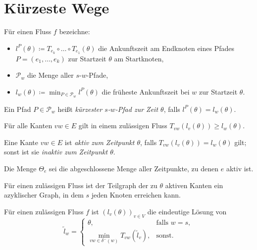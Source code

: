 \section{Kürzeste Wege}

\begin{frame}
	\begin{definition}
		Für einen Fluss $f$ bezeichne:
		\begin{itemize}[label=\color{darkblue}$\bullet$]
			\item\pause $l^P(\theta)\coloneq T_{e_k}\circ\dots\circ T_{e_1}(\theta)$ die Ankunftszeit am Endknoten eines Pfades $P=(e_1,\dots,e_k)$ zur Startzeit $\theta$ am Startknoten,
			\item\pause $\mathcal{P}_w$ die Menge aller $s$-$w$-Pfade,
			\item\pause $l_w(\theta) \coloneq \min_{P\in\mathcal{P}_w} l^P(\theta)$ die früheste Ankunftszeit bei $w$ zur Startzeit $\theta$.
		\end{itemize}
	\pause Ein Pfad $P\in \mathcal{P}_w$ heißt \emph{kürzester $s$-$w$-Pfad zur Zeit $\theta$}, falls $l^P(\theta)=l_w(\theta)$.
	\end{definition}
	\pause\begin{lemma}[Dreiecksungleichung]
		Für alle Kanten $vw\in E$ gilt in einem zulässigen Fluss $T_{vw}(l_v(\theta))\geq l_w(\theta)$.
	\end{lemma}
\end{frame}

\begin{frame}
	\begin{definition}
		Eine Kante $vw\in E$ ist \emph{aktiv zum Zeitpunkt $\theta$}, falls $T_{vw}(l_v(\theta)) = l_w(\theta)$ gilt; sonst ist sie \emph{inaktiv zum Zeitpunkt $\theta$}.
		
		Die Menge $\Theta_e$ sei die abgeschlossene Menge aller Zeitpunkte, zu denen $e$ aktiv ist.
	\end{definition}
	\pause\begin{lemma}
		Für einen zulässigen Fluss ist der Teilgraph der zu $\theta$ aktiven Kanten ein azyklischer Graph, in dem $s$ jeden Knoten erreichen kann.
	\end{lemma}
	\pause\begin{proposition}
			Für einen zulässigen Fluss $f$ ist $(l_v(\theta))_{v\in V}$ die eindeutige Lösung von
		\[ \tilde{l}_w = \begin{cases}
		\theta, & \text{falls } w=s, \\
		\min\limits_{vw\in \delta^-(w)} T_{vw}(\tilde{l}_v), & \text{sonst}.
		\end{cases} \]
	\end{proposition}
\end{frame}